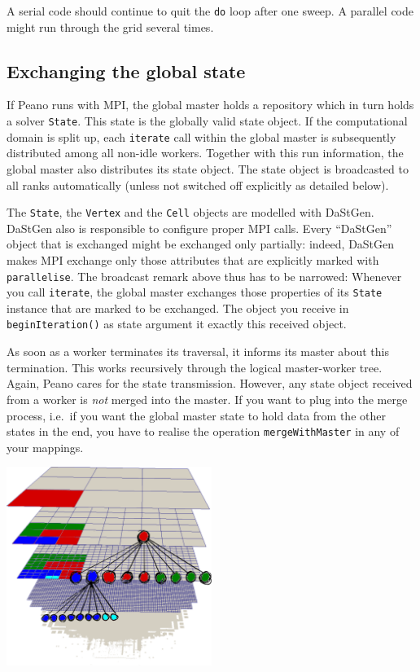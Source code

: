 \noindent
A serial code should continue to quit the \texttt{do} loop after one sweep. 
A parallel code might run through the grid several times.

  
 

\subsection{Exchanging the global state}

If Peano runs with MPI, the global master holds a repository which in turn holds
a solver \texttt{State}. 
This state is the globally valid state object. 
If the computational domain is split up, each \texttt{iterate} call within the
global master is subsequently distributed among all non-idle workers.
Together with this run information, the global master also distributes its state
object.
The state object is broadcasted to all ranks automatically (unless not switched
off explicitly as detailed below).

The \texttt{State}, the \texttt{Vertex} and the \texttt{Cell} objects are
modelled with DaStGen.
DaStGen also is responsible to configure proper MPI calls.
Every ``DaStGen'' object that is exchanged might be exchanged only partially:
indeed, DaStGen makes MPI exchange only those attributes that are explicitly
marked with \texttt{parallelise}.
The broadcast remark above thus has to be narrowed: 
Whenever you call \texttt{iterate}, the global master exchanges those properties
of its \texttt{State} instance that are marked to be exchanged. 
The object you receive in \texttt{beginIteration()} as state argument it exactly
this received object.

As soon as a worker terminates its traversal, it informs its master about this
termination.
This works recursively through the logical master-worker tree.
Again, Peano cares for the state transmission. 
However, any state object received from a worker is {\em not} merged into the
master. 
If you want to plug into the merge process, i.e.~if you want the global master
state to hold data from the other states in the end, you have to realise the
operation \texttt{mergeWithMaster} in any of your mappings.


\begin{center}
  \includegraphics[width=0.5\textwidth]{52_mpi/spacetree-decomposition-top-down.pdf}
\end{center}

